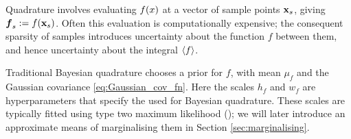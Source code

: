 \documentclass{article}
\begin{document}
Quadrature involves evaluating $f(\lfv)$ at a vector of sample points $\vlfv_s$, giving $\vf\pha_s\deq f(\vlfv_s)$. Often this evaluation is computationally expensive; the consequent sparsity of samples introduces uncertainty about the function $f$ between them, and hence uncertainty about the integral $\inty{f}$.



Traditional Bayesian quadrature chooses a \gpb prior for $f$, with mean $\mu_f$ and the Gaussian covariance \eqref{eq:Gaussian_cov_fn}. Here the scales $h_f$ and $w_f$ are hyperparameters that specify the  \gpb used for Bayesian quadrature. These scales are typically fitted using type two maximum likelihood (); we will later introduce an approximate means of marginalising them in Section \ref{sec:marginalising}.

\end{document}
